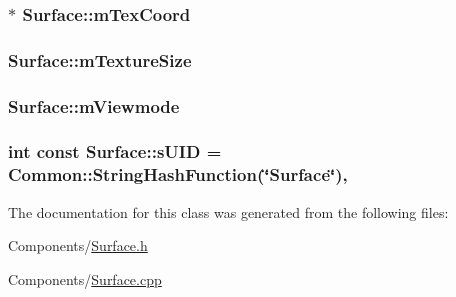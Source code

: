 \subsubsection[{\texorpdfstring{m\+Tex\+Coord}{mTexCoord}}]{$\ast$ Surface\+::m\+Tex\+Coord\hspace{0.3cm}{\ttfamily [private]}}\hypertarget{classSurface_abc58ab23f3d82dd16ddb550d3173618e}{}\label{classSurface_abc58ab23f3d82dd16ddb550d3173618e}
\subsubsection[{\texorpdfstring{m\+Texture\+Size}{mTextureSize}}]{ Surface\+::m\+Texture\+Size\hspace{0.3cm}{\ttfamily [private]}}\hypertarget{classSurface_a9d0d573b14332b5f3ee2d7e2cc78012c}{}\label{classSurface_a9d0d573b14332b5f3ee2d7e2cc78012c}
\subsubsection[{\texorpdfstring{m\+Viewmode}{mViewmode}}]{ Surface\+::m\+Viewmode\hspace{0.3cm}{\ttfamily [private]}}\hypertarget{classSurface_a1d630bf18afc808bf7765e2203280b86}{}\label{classSurface_a1d630bf18afc808bf7765e2203280b86}
\subsubsection[{\texorpdfstring{s\+U\+ID}{sUID}}]{\setlength{\rightskip}{0pt plus 5cm}int const Surface\+::s\+U\+ID = {\bf Common\+::\+String\+Hash\+Function}(\char`\"{}Surface\char`\"{})\hspace{0.3cm}{\ttfamily [static]}, {\ttfamily [private]}}\hypertarget{classSurface_a44624ee5007ddfe4603c8f3d90e0222f}{}\label{classSurface_a44624ee5007ddfe4603c8f3d90e0222f}


The documentation for this class was generated from the following files\+:\begin{DoxyCompactItemize}
\item 
Components/\hyperlink{Surface_8h}{Surface.\+h}\item 
Components/\hyperlink{Surface_8cpp}{Surface.\+cpp}\end{DoxyCompactItemize}
